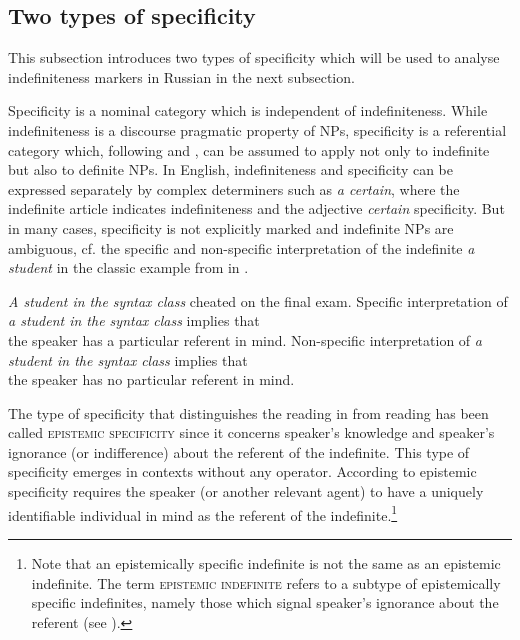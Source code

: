 \documentclass[output=paper,colorlinks,citecolor=brown]{langscibook}
\begin{document}
\subsection{Two types of specificity}\label{geist:sec:2.1}

This subsection introduces two types of specificity which will be used to analyse indefiniteness markers in Russian in the next subsection.

Specificity is a nominal category which is independent of indefiniteness. While indefiniteness is a discourse pragmatic property of NPs, specificity is a referential category which, following \citet{Partee1970} and \citet{vonHeusinger2002}, can be assumed to apply not only to indefinite but also to definite NPs. In English, indefiniteness and specificity can be expressed separately by complex determiners such as \textit{a certain}, where the indefinite article indicates indefiniteness and the adjective \textit{certain} specificity. But in many cases, specificity is not explicitly marked and indefinite NPs are ambiguous, cf. the specific and non-specific interpretation of the indefinite \textit{a student} in the classic example from \citet{Fodor.Sag1982} in .

\ea \textit{A student in the syntax class} cheated on the final exam.\label{geist:ex:fodor-sag}
\ea Specific interpretation of \textit{a student in the syntax class} implies that\label{geist:ex:fodor-sag-a}\\
the speaker has a particular referent in mind.
\ex	Non-specific interpretation of \textit{a student in the syntax class} implies that\label{geist:ex:fodor-sag-b}\\
the speaker has no particular referent in mind.
\z\z

\noindent The type of specificity that distinguishes the reading in  from reading  has been called \textsc{epistemic specificity} \citep{Farkas2002} since it concerns speaker’s knowledge and speaker’s ignorance (or indifference) about the referent of the indefinite. This type of specificity emerges in contexts without any operator. According to \citet{Farkas1995} epistemic specificity requires the speaker (or another relevant agent) to have a uniquely identifiable individual in mind as the referent of the indefinite.\footnote{Note that an epistemically specific indefinite is not the same as an epistemic indefinite. The term \textsc{epistemic indefinite} refers to a subtype of epistemically specific indefinites, namely those which signal speaker's ignorance about the referent (see ).}
\end{document}
